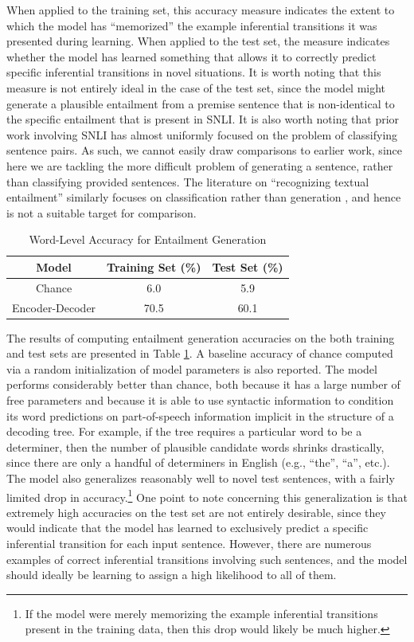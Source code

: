 \documentclass[utf8]{frontiersSCNS} %
\begin{document}
When applied to the training set, this accuracy measure indicates the extent to which the model has ``memorized'' the example inferential transitions it was presented during learning. When applied to the test set, the measure indicates whether the model has learned something that allows it to correctly predict specific inferential transitions in novel situations. It is worth noting that this measure is not entirely ideal in the case of the test set, since the model might generate a plausible entailment from a premise sentence that is non-identical to the specific entailment that is present in SNLI. It is also worth noting that prior work involving SNLI has almost uniformly focused on the problem of classifying sentence pairs. As such, we cannot easily draw comparisons to earlier work, since here we are tackling the more difficult problem of generating a sentence, rather than classifying provided sentences. The literature on ``recognizing textual entailment''  similarly focuses on classification rather than generation \citep[see, e.g.,][]{giampiccolo:2007}, and hence is not a suitable target for comparison.

\begin{table}[!t]
\begin{center} 
\caption{Word-Level Accuracy for Entailment Generation} 
\label{accuracy} 
\vskip 0.12in
\begin{tabular}{c c c} 
\hline
Model  &  Training Set (\%)  & Test Set (\%)\\
\hline
\rule{0pt}{3ex}Chance  &  6.0 &  5.9 \\
Encoder-Decoder  &  70.5 & 60.1  \\
\hline
\end{tabular} 
\end{center} 
\end{table}

The results of computing entailment generation accuracies on the both training and test sets are presented in Table \ref{accuracy}. A baseline accuracy of chance computed via a random initialization of model parameters is also reported. The model performs considerably better than chance, both because it has a large number of free parameters and because it is able to use syntactic information to condition its word predictions on part-of-speech information implicit in the structure of a decoding tree. For example, if the tree requires a particular word to be a determiner, then the number of plausible candidate words shrinks drastically, since there are only a handful of determiners in English (e.g., ``the'', ``a'', etc.). The model also generalizes reasonably well to novel test sentences, with a fairly limited drop in accuracy.\footnote{If the model were merely memorizing the example inferential transitions present in the training data, then this drop would likely be much higher.} One point to note concerning this generalization is that extremely high accuracies on the test set are not entirely desirable, since they would indicate that the model has learned to exclusively predict a specific inferential transition for each input sentence. However, there are numerous examples of correct inferential transitions involving such sentences, and the model should ideally be learning to assign a high likelihood to all of them.  
\end{document}
